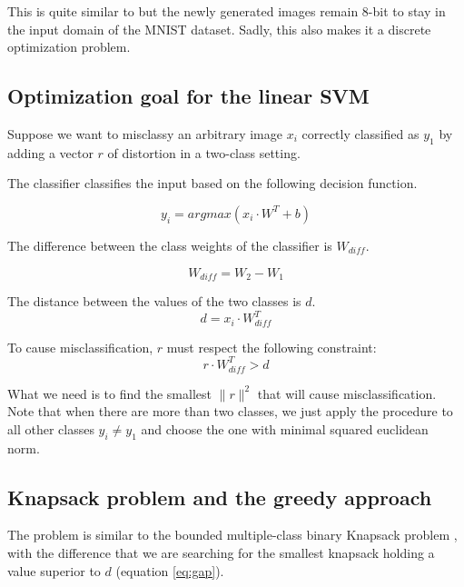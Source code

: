 \documentclass{article} %
\begin{document}
This is quite similar to \citep{szegedy_intriguing_2013} but the newly
generated images remain 8-bit to stay in the input domain of the MNIST dataset.
Sadly, this also makes it a discrete optimization problem.


\subsection{Optimization goal for the linear SVM}

Suppose we want to misclassy an arbitrary image $x_i$ correctly classified
as $y_1$ by adding a vector $r$ of distortion in a two-class setting.

The classifier classifies the input based on the following decision function.

\begin{equation}
\label{eq:decision_function}
  y_i = argmax (x_i \cdot W^T + b)
\end{equation}


The difference between the class weights of the classifier is $W_{diff}$.

\begin{equation}
\label{eq:difference}
  W_{diff} = W_2 - W_1
\end{equation}

The distance between the values of the two classes is $d$.
\begin{equation}
\label{eq:gap}
  d = x_i \cdot W_{diff}^T
\end{equation}


To cause misclassification, $r$ must respect the following constraint:
\begin{equation}
\label{eq:noise_threshold}
  r \cdot W_{diff}^T > d
\end{equation}

What we need is to find the smallest $ \lVert{r} \rVert^2$ that will cause
misclassification. Note that when there are more than two classes, we just
apply the procedure to all other classes $y_i \neq y_1$ and choose the one
with minimal squared euclidean norm.


\subsection{Knapsack problem and the greedy approach}

The problem is similar to the bounded multiple-class binary Knapsack problem
\citep{vanderbeck_extending_2002}, with the difference that we are searching
for the smallest knapsack holding a value superior to $d$ (equation
\ref{eq:gap}).
\end{document}
